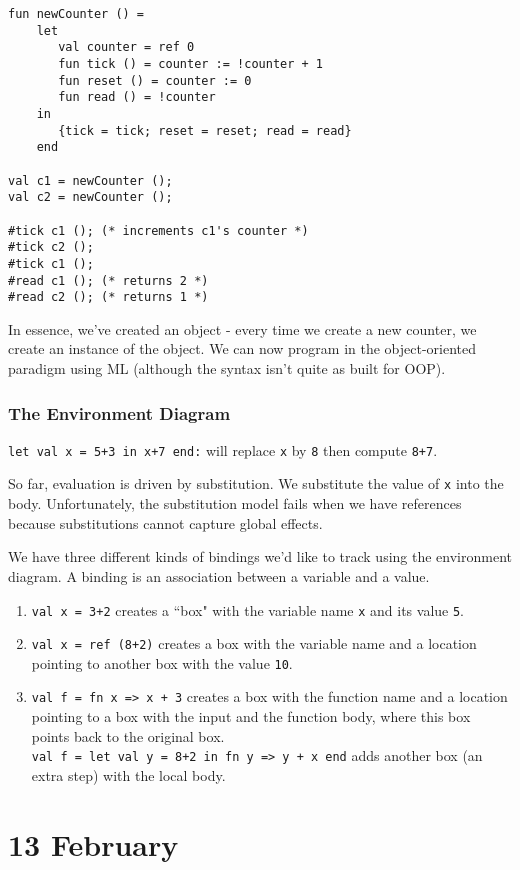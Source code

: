 \documentclass[11pt]{article}
\begin{document}
\begin{verbatim}
fun newCounter () =
    let
       val counter = ref 0
       fun tick () = counter := !counter + 1
       fun reset () = counter := 0
       fun read () = !counter
    in
       {tick = tick; reset = reset; read = read}
    end

val c1 = newCounter (); 
val c2 = newCounter ();

#tick c1 (); (* increments c1's counter *)
#tick c2 ();
#tick c1 ();
#read c1 (); (* returns 2 *)
#read c2 (); (* returns 1 *)
\end{verbatim}

In essence, we've created an object - every time we create a new counter, we create an instance of the object. We can now program in the object-oriented paradigm using ML (although the syntax isn't quite as built for OOP).

\subsubsection{The Environment Diagram}

\verb~let val x = 5+3 in x+7 end:~ will replace \verb~x~ by \verb~8~ then compute \verb~8+7~.

So far, evaluation is driven by substitution. We substitute the value of \verb~x~ into the body. Unfortunately, the substitution model fails when we have references because substitutions cannot capture global effects.

We have three different kinds of bindings we'd like to track using the environment diagram. A binding is an association between a variable and a value.
\begin{enumerate}
    \item \verb~val x = 3+2~ creates a ``box" with the variable name \verb~x~ and its value \verb~5~.
    \item \verb~val x = ref (8+2)~ creates a box with the variable name and a location pointing to another box with the value \verb~10~.
    \item \verb~val f = fn x => x + 3~ creates a box with the function name and a location pointing to a box with the input and the function body, where this box points back to the original box. \\
        \verb~val f = let val y = 8+2 in fn y => y + x end~ adds another box (an extra step) with the local body.
\end{enumerate}

\section{13 February}
\end{document}
